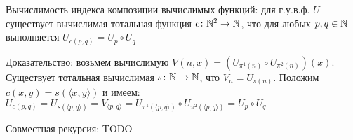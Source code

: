 \documentclass[a4paper, 10pt]{article}
\begin{document}
Вычислимость индекса композиции вычислимых функций: для г.у.в.ф. $U$ существует вычислимая тотальная функция $c\colon\mathbb{N}^2\to\mathbb{N}$, что для любых $p,q\in\mathbb{N}$ выполняется $U_{c(p,q)}=U_p \circ U_q$

Доказательство: возьмем вычислимую $V(n,x)=(U_{\pi^1(n)}\circ U_{\pi^2(n)})(x)$. Существует тотальная вычислимая $s\colon\mathbb{N}\to\mathbb{N}$, что $V_n=U_{s(n)}$. Положим $c(x,y)=s(\langle x,y \rangle)$ и имеем: $U_{c(p,q)}=U_{s(\langle p,q\rangle)}=V_{\langle p,q \rangle}=U_{\pi^1(\langle p,q \rangle)}\circ U_{\pi^2(\langle p,q \rangle)}=U_p \circ U_q$

\hfill

Совместная рекурсия: TODO
\end{document}
